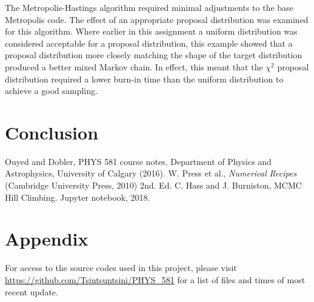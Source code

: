 \message{ !name(Assn1.tex)}\documentclass[twocolumn]{article}
\begin{document}
The Metropolis-Hastings algorithm required minimal adjustments to the base Metropolis code. The effect of an appropriate proposal distribution was examined for this algorithm. Where earlier in this assignment a uniform distribution was considered acceptable for a proposal distribution, this example showed that a proposal distribution more closely matching the shape of the target distribution produced a better mixed Markov chain. In effect, this meant that the $\chi^2$ proposal distribution required a lower burn-in time than the uniform distribution to achieve a good sampling. 
 
\section{Conclusion}



\begin{thebibliography}{00}
	Ouyed and Dobler, PHYS 581 course notes, Department of Physics and Astrophysics, University of Calgary (2016).
	W. Press et al., \emph{Numerical Recipes} (Cambridge University Press, 2010) 2nd. Ed.
	C. Hass and J. Burniston, MCMC Hill Climbing. Jupyter notebook, 2018.
\end{thebibliography}

\section{Appendix}
For access to the source codes used in this project, please visit \url{https://github.com/Tsintsuntsini/PHYS_581} for a list of files and times of most recent update.
	
\end{document}
